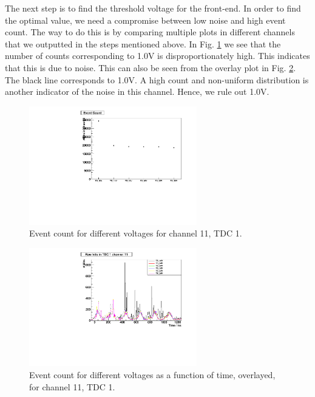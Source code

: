 \documentclass[a4paper]{report}
\numberwithin{equation}{section}
\begin{document}
The next step is to find the threshold voltage for the front-end. In order to find the optimal value, we need a compromise between low noise and high event count. The way to do this is by comparing multiple plots in different channels that we outputted in the steps mentioned above. In Fig. \ref{fig:remove_10} we see that the number of counts corresponding to 1.0V is disproportionately high. This indicates that this is due to noise. This can also be seen from the overlay plot in Fig. \ref{fig:remove_10_1}. The black line corresponds to 1.0V. A high count and non-uniform distribution is another indicator of the noise in this channel. Hence, we rule out 1.0V. 

\begin{figure}[htpb]
    \centering
    \includegraphics[width=0.65\textwidth]{StyxThresholdScan_1_11_Rate.pdf}
    \caption{Event count for different voltages for channel 11, TDC 1.}
    \label{fig:remove_10}
\end{figure}

\begin{figure}[htpb]
    \centering
    \includegraphics[width=0.65\textwidth]{StyxThresholdScan_1_11_Overlay.pdf}
    \caption{Event count for different voltages as a function of time, overlayed, for channel 11, TDC 1.}
    \label{fig:remove_10_1}
\end{figure}
\end{document}
